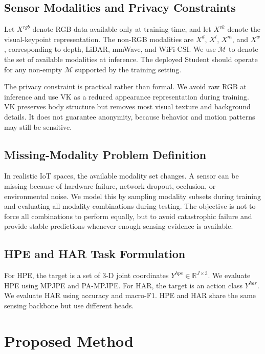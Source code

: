 \documentclass[journal]{IEEEtran}
\begin{document}
\subsection{Sensor Modalities and Privacy Constraints}

Let \(X^{rgb}\) denote RGB data available only at training time, and let \(X^{vk}\) denote the visual-keypoint representation. The non-RGB modalities are \(X^d\), \(X^l\), \(X^m\), and \(X^w\), corresponding to depth, LiDAR, mmWave, and WiFi-CSI. We use \(\mathcal{M}\) to denote the set of available modalities at inference. The deployed Student should operate for any non-empty \(\mathcal{M}\) supported by the training setting.

The privacy constraint is practical rather than formal. We avoid raw RGB at inference and use VK as a reduced appearance representation during training. VK preserves body structure but removes most visual texture and background details. It does not guarantee anonymity, because behavior and motion patterns may still be sensitive.

\subsection{Missing-Modality Problem Definition}

In realistic IoT spaces, the available modality set changes. A sensor can be missing because of hardware failure, network dropout, occlusion, or environmental noise. We model this by sampling modality subsets during training and evaluating all modality combinations during testing. The objective is not to force all combinations to perform equally, but to avoid catastrophic failure and provide stable predictions whenever enough sensing evidence is available.

\subsection{HPE and HAR Task Formulation}

For HPE, the target is a set of 3-D joint coordinates \(Y^{hpe}\in\mathbb{R}^{J\times 3}\). We evaluate HPE using MPJPE and PA-MPJPE. For HAR, the target is an action class \(Y^{har}\). We evaluate HAR using accuracy and macro-F1. HPE and HAR share the same sensing backbone but use different heads.

\section{Proposed Method}
\end{document}
